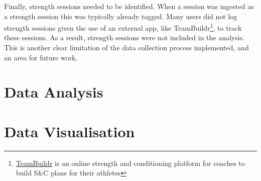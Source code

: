 Finally, strength sessions needed to be identified. When a session was ingested as a strength session this was typically already tagged. Many users did not log strength sessions given the use of an external app, like TeamBuildr\footnote{\href{https://www.teambuildr.com/}{TeamBuildr} is an online strength and conditioning platform for coaches to build S\&C plans for their athletes}, to track these sessions. As a result, strength sessions were not included in the analysis. This is another clear limitation of the data collection process implemented, and an area for future work.

\section{Data Analysis}

\section{Data Visualisation}